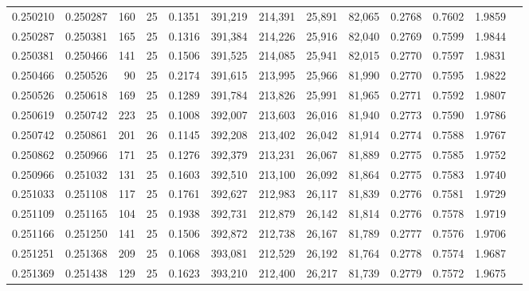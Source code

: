 \begin{tabular}{rrrrrrrrrrrrr}
0.250210 & 0.250287 &   160 &  25 &                                     0.1351 & 391,219 & 214,391 &  25,891 &  82,065 & 0.2768 & 0.7602 & 1.9859 \\
0.250287 & 0.250381 &   165 &  25 &                                     0.1316 & 391,384 & 214,226 &  25,916 &  82,040 & 0.2769 & 0.7599 & 1.9844 \\
0.250381 & 0.250466 &   141 &  25 &                                     0.1506 & 391,525 & 214,085 &  25,941 &  82,015 & 0.2770 & 0.7597 & 1.9831 \\
0.250466 & 0.250526 &    90 &  25 &                                     0.2174 & 391,615 & 213,995 &  25,966 &  81,990 & 0.2770 & 0.7595 & 1.9822 \\
0.250526 & 0.250618 &   169 &  25 &                                     0.1289 & 391,784 & 213,826 &  25,991 &  81,965 & 0.2771 & 0.7592 & 1.9807 \\
0.250619 & 0.250742 &   223 &  25 &                                     0.1008 & 392,007 & 213,603 &  26,016 &  81,940 & 0.2773 & 0.7590 & 1.9786 \\
0.250742 & 0.250861 &   201 &  26 &                                     0.1145 & 392,208 & 213,402 &  26,042 &  81,914 & 0.2774 & 0.7588 & 1.9767 \\
0.250862 & 0.250966 &   171 &  25 &                                     0.1276 & 392,379 & 213,231 &  26,067 &  81,889 & 0.2775 & 0.7585 & 1.9752 \\
0.250966 & 0.251032 &   131 &  25 &                                     0.1603 & 392,510 & 213,100 &  26,092 &  81,864 & 0.2775 & 0.7583 & 1.9740 \\
0.251033 & 0.251108 &   117 &  25 &                                     0.1761 & 392,627 & 212,983 &  26,117 &  81,839 & 0.2776 & 0.7581 & 1.9729 \\
0.251109 & 0.251165 &   104 &  25 &                                     0.1938 & 392,731 & 212,879 &  26,142 &  81,814 & 0.2776 & 0.7578 & 1.9719 \\
0.251166 & 0.251250 &   141 &  25 &                                     0.1506 & 392,872 & 212,738 &  26,167 &  81,789 & 0.2777 & 0.7576 & 1.9706 \\
0.251251 & 0.251368 &   209 &  25 &                                     0.1068 & 393,081 & 212,529 &  26,192 &  81,764 & 0.2778 & 0.7574 & 1.9687 \\
0.251369 & 0.251438 &   129 &  25 &                                     0.1623 & 393,210 & 212,400 &  26,217 &  81,739 & 0.2779 & 0.7572 & 1.9675 \\

\end{tabular}
